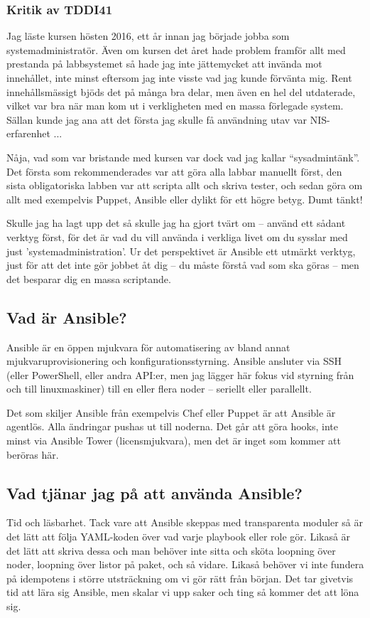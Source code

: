 \subsubsection{Kritik av TDDI41}
Jag läste kursen hösten 2016, ett år innan jag började jobba som systemadministratör.
Även om kursen det året hade problem framför allt med prestanda på labbsystemet så hade jag inte jättemycket att invända mot innehållet, inte minst eftersom jag inte visste vad jag kunde förvänta mig.
Rent innehållsmässigt bjöds det på många bra delar, men även en hel del utdaterade, vilket var bra när man kom ut i verkligheten med en massa förlegade system. Sällan kunde jag ana att det första jag 
skulle få användning utav var NIS-erfarenhet ...

Nåja, vad som var bristande med kursen var dock vad jag kallar ``sysadmintänk''. Det första som rekommenderades var att göra alla labbar manuellt först, den sista obligatoriska labben var att scripta allt och skriva tester,
och sedan göra om allt med exempelvis Puppet, Ansible eller dylikt för ett högre betyg. Dumt tänkt!

Skulle jag ha lagt upp det så skulle jag ha gjort tvärt om -- använd ett sådant verktyg först, för det är vad du vill använda i verkliga livet om du sysslar med just 'systemadministration'.
Ur det perspektivet är Ansible ett utmärkt verktyg, just för att det inte gör jobbet åt dig -- du måste förstå vad som ska göras -- men det besparar dig en massa scriptande.

\subsection{Vad är Ansible?}
Ansible är en öppen mjukvara för automatisering av bland annat mjukvaruprovisionering och konfigurationsstyrning. Ansible ansluter via SSH (eller PowerShell, eller andra API:er, men jag lägger här fokus vid styrning från och till linuxmaskiner) till en eller flera noder -- seriellt eller parallellt.

Det som skiljer Ansible från exempelvis Chef eller Puppet är att Ansible är agentlös. Alla ändringar pushas ut till noderna. Det går att göra hooks, inte minst via Ansible Tower (licensmjukvara), men det är inget som kommer att beröras här.

\subsection{Vad tjänar jag på att använda Ansible?}
Tid och läsbarhet. Tack vare att Ansible skeppas med transparenta moduler så är det lätt att följa YAML-koden över vad varje playbook eller role gör. 
Likaså är det lätt att skriva dessa och man behöver inte sitta och sköta loopning över noder, loopning över listor på paket, och så vidare. Likaså behöver vi inte fundera på idempotens i större utsträckning om vi gör rätt från början.
Det tar givetvis tid att lära sig Ansible, men skalar vi upp saker och ting så kommer det att löna sig.

